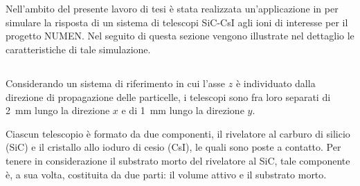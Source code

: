 \section{}

Nell'ambito del presente lavoro di tesi è stata realizzata un'applicazione in \geant{} per simulare la risposta di un sistema di telescopi SiC-CsI agli ioni di interesse per il progetto NUMEN.
Nel seguito di questa sezione vengono illustrate nel dettaglio le caratteristiche di tale simulazione.




\subsection{}

Considerando un sistema di riferimento in cui l'asse $z$ è individuato dalla direzione di propagazione delle particelle, i telescopi sono fra loro separati di 2~mm lungo la direzione $x$ e di 1~mm lungo la direzione $y$.

Ciascun telescopio è formato da due componenti, il rivelatore al carburo di silicio (SiC) e il cristallo allo ioduro di cesio (CsI), le quali sono poste a contatto.
Per tenere in considerazione il substrato morto del rivelatore al SiC, tale componente è, a sua volta, costituita da due parti: il volume attivo e il substrato morto.
%




